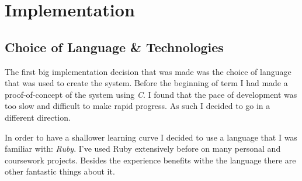 \chapter{Implementation}

\section{Choice of Language \& Technologies}

The first big implementation decision that was made was the choice of language
that was used to create the system. Before the beginning of term I had made
a proof-of-concept of the system using \emph{C}. I found that the pace of
development was too slow and difficult to make rapid progress. As such
I decided to go in a different direction.

In order to have a shallower learning curve I decided to use a language that
I was familiar with: \emph{Ruby}. I've used Ruby extensively before on many
personal and coursework projects. Besides the experience benefits withe the
language there are other fantastic things about it.

